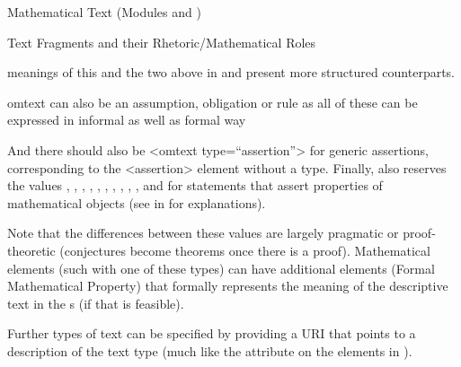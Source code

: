 \begin{tchapter}[id=mtxt,short=Mathematical Text]{Mathematical Text (Modules
  {} and {})}
\begin{tsection}[id=omtext]{Text Fragments and their Rhetoric/Mathematical Roles}
\begin{description}
  meanings of this and the two above in {} and present more structured
  counterparts.
\end{description} 
\begin{erratum}[reported-by=Gordan Ristovski,date=2008-06-18]{omtext can also be an assumption, obligation or rule as all of these can be expressed in informal as well as formal way}
\begin{erratum}[reported-by=Christoph Lange,date=2008-07-02]{And there should also be <omtext type=``assertion''> for generic assertions, corresponding to the <assertion> element without a type.}
Finally, {\omdoc} also reserves the values {}, {},
{}, {},
{}, {},
{}, {}, {}, {}, {} and
{} for statements that assert properties of mathematical
objects (see {} in {} for
explanations).\end{erratum}\end{erratum} Note that the differences between these values are largely pragmatic or
proof-theoretic (conjectures become theorems once there is a proof).  Mathematical
{} elements (such with one of these types) can have additional
{} elements (Formal Mathematical Property) that formally represents the
meaning of the descriptive text in the {}s (if that is feasible).

Further types of text can be specified by providing a URI that points to a description of
the text type (much like the {} attribute on
the {} elements in {\cmathml}).


\end{tsection}
\end{tchapter}
